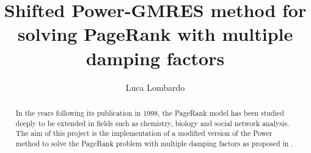 \documentclass[11pt]{article}
\title{Shifted Power-GMRES method for solving PageRank with multiple damping factors}
\author{Luca Lombardo}
\date{}
\begin{document}
\maketitle

\begin{abstract}
    \noindent In the years following its publication in 1998, the PageRank model has been studied deeply to be extended in fields such as chemistry, biology and social network analysis. The aim of this project is the implementation of a modified version of the Power method to solve the PageRank problem with multiple damping factors as proposed in \cite{SHEN2022126799}.
\end{abstract}

\tableofcontents
\clearpage






\clearpage


\nocite{*}
\end{document}
